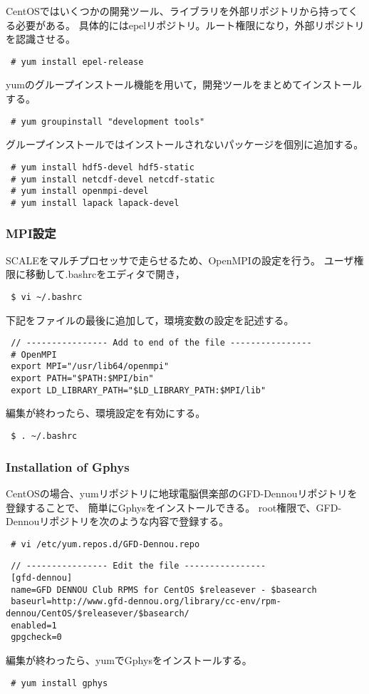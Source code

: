 CentOSではいくつかの開発ツール、ライブラリを外部リポジトリから持ってくる必要がある。
具体的にはepelリポジトリ。ルート権限になり，外部リポジトリを認識させる。
\begin{verbatim}
 # yum install epel-release
\end{verbatim}
yumのグループインストール機能を用いて，開発ツールをまとめてインストールする。
\begin{verbatim}
 # yum groupinstall "development tools"
\end{verbatim}
グループインストールではインストールされないパッケージを個別に追加する。
\begin{verbatim}
 # yum install hdf5-devel hdf5-static
 # yum install netcdf-devel netcdf-static
 # yum install openmpi-devel
 # yum install lapack lapack-devel
\end{verbatim}


\subsubsection{MPI設定}

SCALEをマルチプロセッサで走らせるため、OpenMPIの設定を行う。
ユーザ権限に移動して.bashrcをエディタで開き，
\begin{verbatim}
 $ vi ~/.bashrc
\end{verbatim}
下記をファイルの最後に追加して，環境変数の設定を記述する。
\begin{verbatim}
 // ---------------- Add to end of the file ----------------
 # OpenMPI
 export MPI="/usr/lib64/openmpi"
 export PATH="$PATH:$MPI/bin"
 export LD_LIBRARY_PATH="$LD_LIBRARY_PATH:$MPI/lib"
\end{verbatim}
編集が終わったら、環境設定を有効にする。
\begin{verbatim}
 $ . ~/.bashrc
\end{verbatim}


\subsubsection{Installation of Gphys}

CentOSの場合、yumリポジトリに地球電脳倶楽部のGFD-Dennouリポジトリを登録することで、
簡単にGphysをインストールできる。
root権限で、GFD-Dennouリポジトリを次のような内容で登録する。

\begin{verbatim}
 # vi /etc/yum.repos.d/GFD-Dennou.repo
\end{verbatim}

\begin{verbatim}
 // ---------------- Edit the file ----------------
 [gfd-dennou]
 name=GFD DENNOU Club RPMS for CentOS $releasever - $basearch
 baseurl=http://www.gfd-dennou.org/library/cc-env/rpm-dennou/CentOS/$releasever/$basearch/
 enabled=1
 gpgcheck=0
\end{verbatim}
編集が終わったら、yumでGphysをインストールする。
\begin{verbatim}
 # yum install gphys
\end{verbatim}

